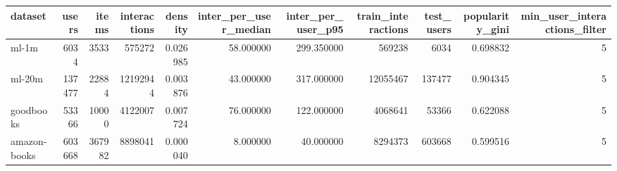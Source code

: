 \begin{tabular}{lrrrrrrrrrr}
\toprule
dataset & users & items & interactions & density & inter_per_user_median & inter_per_user_p95 & train_interactions & test_users & popularity_gini & min_user_interactions_filter \\
\midrule
ml-1m & 6034 & 3533 & 575272 & 0.026985 & 58.000000 & 299.350000 & 569238 & 6034 & 0.698832 & 5 \\
ml-20m & 137477 & 22884 & 12192944 & 0.003876 & 43.000000 & 317.000000 & 12055467 & 137477 & 0.904345 & 5 \\
goodbooks & 53366 & 10000 & 4122007 & 0.007724 & 76.000000 & 122.000000 & 4068641 & 53366 & 0.622088 & 5 \\
amazon-books & 603668 & 367982 & 8898041 & 0.000040 & 8.000000 & 40.000000 & 8294373 & 603668 & 0.599516 & 5 \\
\bottomrule
\end{tabular}
